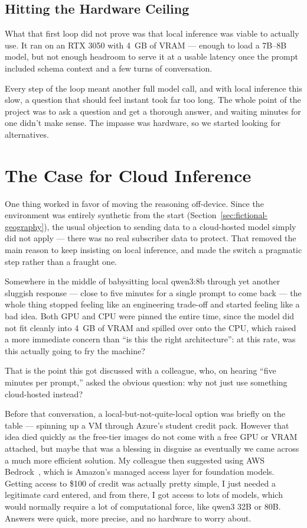 \subsection{Hitting the Hardware Ceiling}

What that first loop did not prove was that local inference was viable to
actually use. It ran on an RTX 3050 with 4~GB of VRAM — enough to load a
7B–8B model, but not enough headroom to serve it at a usable latency once
the prompt included schema context and a few turns of conversation.

Every step of the loop meant another full model call, and with local inference
this slow, a question that should feel instant took far too long. The whole
point of the project was to ask a question and get a thorough answer, and
waiting minutes for one didn't make sense. The impasse was hardware, so we
started looking for alternatives.

\section{The Case for Cloud Inference}

One thing worked in favor of moving the reasoning off-device. Since the
environment was entirely synthetic from the start
(Section~\ref{sec:fictional-geography}), the usual objection to sending
data to a cloud-hosted model simply did not apply — there was no real
subscriber data to protect. That removed the main reason to keep
insisting on local inference, and made the switch a pragmatic step rather
than a fraught one.

Somewhere in the middle of babysitting local qwen3:8b through yet another
sluggish response — close to five minutes for a single prompt to come
back — the whole thing stopped feeling like an engineering trade-off and
started feeling like a bad idea. Both GPU and CPU were pinned the entire
time, since the model did not fit cleanly into 4~GB of VRAM and spilled
over onto the CPU, which raised a more immediate concern than ``is this
the right architecture'': at this rate, was this actually going to fry
the machine?

That is the point this got discussed with a colleague, who, on hearing
``five minutes per prompt,'' asked the obvious question: why not just use
something cloud-hosted instead?

Before that conversation, a local-but-not-quite-local option was briefly
on the table — spinning up a VM through Azure's student credit pack. However that idea
died quickly as the free-tier images do not come with a free GPU or VRAM attached, 
but maybe that was a blessing in disguise as eventually we came across a much more 
efficient solution.
My colleague then suggested using  AWS Bedrock~\cite{aws_bedrock}, which is Amazon's managed
access layer for foundation models. Getting access to \$100 of credit was actually pretty 
simple, I just needed a legitimate card entered, and from there, I got access to lots of 
models, which would normally require a lot of computational force, like qwen3 32B or 80B.
Answers were quick, more precise, and no hardware to worry about.


